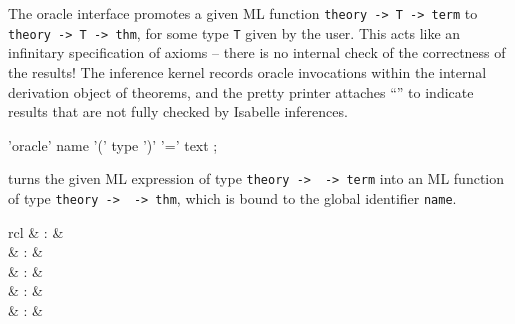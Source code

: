 \begin{isabellebody}
\begin{isamarkuptext}
  The oracle interface promotes a given ML function \verb|theory -> T -> term| to \verb|theory -> T -> thm|, for some
  type \verb|T| given by the user.  This acts like an infinitary
  specification of axioms -- there is no internal check of the
  correctness of the results!  The inference kernel records oracle
  invocations within the internal derivation object of theorems, and
  the pretty printer attaches ``\isa{{\isachardoublequote}{\isacharbrackleft}{\isacharbang}{\isacharbrackright}{\isachardoublequote}}'' to indicate results
  that are not fully checked by Isabelle inferences.

  \begin{rail}
    'oracle' name '(' type ')' '=' text
    ;
  \end{rail}

  \begin{descr}

  \item [\mbox{\isa{\isacommand{oracle}}}~\isa{{\isachardoublequote}name\ {\isacharparenleft}type{\isacharparenright}\ {\isacharequal}\ text{\isachardoublequote}}] turns the
  given ML expression  of type
  \verb|theory ->|~~\verb|-> term| into an
  ML function of type
  \verb|theory ->|~~\verb|-> thm|, which is
  bound to the global identifier \verb|name|.

  \end{descr}%
\end{isamarkuptext}%
\isamarkuptrue%
%
\isamarkuptrue%
%
\isamarkuptrue%
%
\begin{isamarkuptext}%
\begin{matharray}{rcl}
    \mbox{} & : &  \\
    \mbox{} & : &  \\
    \mbox{} & : &  \\
    \mbox{} & : &  \\
    \mbox{} & : &  \\
  \end{matharray}


\end{isamarkuptext}
\end{isabellebody}
